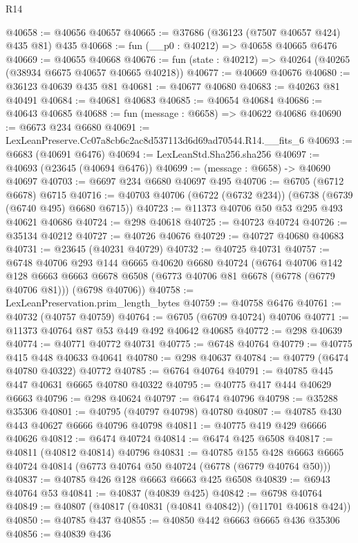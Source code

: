 \begin{lexlean}{R14}
\begin{coremodule}
@40658 := @40656 @40657
@40665 := @37686 (@36123 (@7507 @40657 @424) @435 @81) @435
@40668 := fun (__p0 : @40212) => @40658 @40665 @6476
@40669 := @40655 @40668
@40676 := fun (state : @40212) => @40264 (@40265 (@38934 @6675 @40657 @40665 @40218))
@40677 := @40669 @40676
@40680 := @36123 @40639 @435 @81
@40681 := @40677 @40680
@40683 := @40263 @81 @40491
@40684 := @40681 @40683
@40685 := @40654 @40684
@40686 := @40643 @40685
@40688 := fun (message : @6658) => @40622 @40686
@40690 := @6673 @234 @6680
@40691 := LexLeanPreserve.Cc07a8cb6c2ac8d537113d6d69ad70544.R14.__fits_6
@40693 := @6683 (@40691 @6476)
@40694 := LexLeanStd.Sha256.sha256
@40697 := @40693 (@23645 (@40694 @6476))
@40699 := (message : @6658) -> @40690 @40697
@40703 := @6697 @234 @6680 @40697 @495
@40706 := @6705 (@6712 @6678) @6715
@40716 := @40703 @40706 (@6722 (@6732 @234)) (@6738 (@6739 (@6740 @495) @6680 @6715))
@40723 := @11373 @40706 @50 @53 @295 @493 @40621 @40686
@40724 := @298 @40618
@40725 := @40723 @40724
@40726 := @35134 @40212
@40727 := @40726 @40676
@40729 := @40727 @40680 @40683
@40731 := @23645 (@40231 @40729)
@40732 := @40725 @40731
@40757 := @6748
    @40706
    @293
    @144
    @6665
    @40620
    @6680
    @40724
    (@6764
      @40706
      @142
      @128
      @6663
      @6663
      @6678
      @6508
      (@6773 @40706 @81 @6678 (@6778 (@6779 @40706 @81)))
      (@6798 @40706))
@40758 := LexLeanPreservation.prim_length_bytes
@40759 := @40758 @6476
@40761 := @40732 (@40757 @40759)
@40764 := @6705 (@6709 @40724) @40706
@40771 := @11373 @40764 @87 @53 @449 @492 @40642 @40685
@40772 := @298 @40639
@40774 := @40771 @40772 @40731
@40775 := @6748 @40764
@40779 := @40775 @415 @448 @40633 @40641
@40780 := @298 @40637
@40784 := @40779 (@6474 @40780 @40322) @40772
@40785 := @6764 @40764
@40791 := @40785 @445 @447 @40631 @6665 @40780 @40322
@40795 := @40775 @417 @444 @40629 @6663
@40796 := @298 @40624
@40797 := @6474 @40796
@40798 := @35288 @35306
@40801 := @40795 (@40797 @40798) @40780
@40807 := @40785 @430 @443 @40627 @6666 @40796 @40798
@40811 := @40775 @419 @429 @6666 @40626
@40812 := @6474 @40724
@40814 := @6474 @425 @6508
@40817 := @40811 (@40812 @40814) @40796
@40831 := @40785
    @155
    @428
    @6663
    @6665
    @40724
    @40814
    (@6773 @40764 @50 @40724 (@6778 (@6779 @40764 @50)))
@40837 := @40785 @426 @128 @6663 @6663 @425 @6508
@40839 := @6943 @40764 @53
@40841 := @40837 (@40839 @425)
@40842 := @6798 @40764
@40849 := @40807 (@40817 (@40831 (@40841 @40842)) (@11701 @40618 @424))
@40850 := @40785 @437
@40855 := @40850 @442 @6663 @6665 @436 @35306
@40856 := @40839 @436

\end{coremodule}
\end{lexlean}
